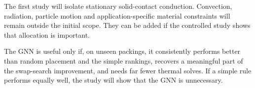 \documentclass[10pt,a4paper]{article}
\begin{document}
The first study will isolate stationary solid-contact conduction. Convection,
radiation, particle motion and application-specific material constraints will
remain outside the initial scope. They can be added if the controlled study
shows that allocation is important.

The GNN is useful only if, on unseen packings, it consistently performs better
than random placement and the simple rankings, recovers a meaningful part of
the swap-search improvement, and needs far fewer thermal solves. If a simple
rule performs equally well, the study will show that the GNN is unnecessary.
\end{document}
